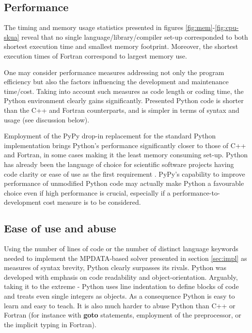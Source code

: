 \documentclass[final,5p,times,twocolumn]{elsarticle}
\newcommand{\prog}[1]{{\rm\bf#1}}
\begin{document}
  \subsection{Performance}
  
  The timing and memory usage statistics presented in figures \ref{fig:mem}-\ref{fig:cpu-skua}
    reveal that no single language/library/compiler set-up 
    corresponded to both shortest execution time and smallest memory footprint.
  Moreover, the shortest execution times of Fortran correspond to largest memory use.

  One may consider performance measures addressing not only the program efficiency but also 
    the factors influencing the development and maintenance time/cost.
  Taking into account such measures as code length or coding time,
    the Python environment clearly gains significantly.
  Presented Python code is shorter than the C++ and Fortran counterparts,
    and is simpler in terms of syntax and usage (see discussion below).

  Employment of the PyPy drop-in replacement for the standard Python implementation brings 
    Python's performance significantly closer to those of C++ and Fortran, in some
    cases making it the least memory consuming set-up.
  Python has already been the language of choice for scientific software projects having code clarity 
    or ease of use as the first requirement \citep[see e.g.][]{Barnes_and_Jones_2011}.
  PyPy's capability to improve performance of unmodified Python code may actually 
    make Python a favourable choice even if high performance is crucial, especially
    if a performance-to-development cost measure is to be considered. 

  \subsection{Ease of use and abuse}

  Using the number of lines of code or the number of distinct language keywords
    needed to implement the MPDATA-based
    solver presented in section \ref{sec:impl} as measures of syntax 
    brevity, Python clearly surpasses its rivals.
  Python was developed with emphasis on code readability and object-orientation.
  Arguably, taking it to the extreme - Python uses line indentation to define 
    blocks of code and treats even single integers as objects.
  As a consequence Python is easy to learn and easy to teach.
  It is also much harder to abuse Python than C++ or Fortran
    (for instance with \prog{goto} statements, employment of the preprocessor,
    or the implicit typing in Fortran).
\end{document}
